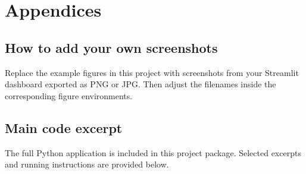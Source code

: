 \documentclass[a4paper, oneside, 12pt, final]{extreport}
\begin{document}



\appendix
\chapter{Appendices}
\section{How to add your own screenshots}
Replace the example figures in this project with screenshots from your Streamlit dashboard exported as PNG or JPG.
Then adjust the filenames inside the corresponding figure environments.

\section{Main code excerpt}
The full Python application is included in this project package. Selected excerpts and running instructions are provided below.



\printglossaries
\printindex
\end{document}
